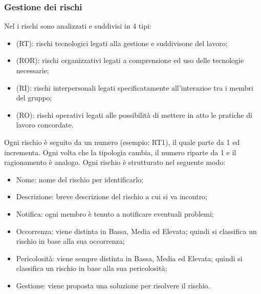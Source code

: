 \subsubsection{Gestione dei rischi} {
	Nel \PdP{} i rischi sono analizzati e suddivisi in 4 tipi: 
	\begin{itemize}
		\item (RT): rischi tecnologici legati alla gestione e suddivisone del lavoro;
		\item (ROR): rischi organizzativi legati a comprensione ed uso delle tecnologie necessarie;
		\item (RI): rischi interpersonali legati specificatamente all'interazioe tra i membri del gruppo;
		\item (RO): rischi operativi legati alle possibilità di mettere in atto le pratiche di lavoro concordate.
	\end{itemize} 
	Ogni rischio è seguito da un numero (esempio: RT1), il quale parte da 1 ed incrementa. 
	Ogni volta che la tipologia cambia, il numero riparte da 1 e il ragionamento è analogo. 
	Ogni rischio è strutturato nel seguente modo:
	\begin{itemize}
		\item Nome: nome del rischio per identificarlo;
		\item Descrizione: breve descrizione del rischio a cui si va incontro;
		\item Notifica: ogni membro è tenuto a notificare eventuali problemi;
		\item Occorrenza: viene distinta in Bassa, Media ed Elevata; quindi si classifica un rischio in base alla sua occorrenza;
		\item Pericolosità: viene sempre distinta in Bassa, Media ed Elevata; quindi si classifica un rischio in base alla sua pericolosità;
		\item Gestione: viene proposta una soluzione per risolvere il rischio.
	\end{itemize}
}

